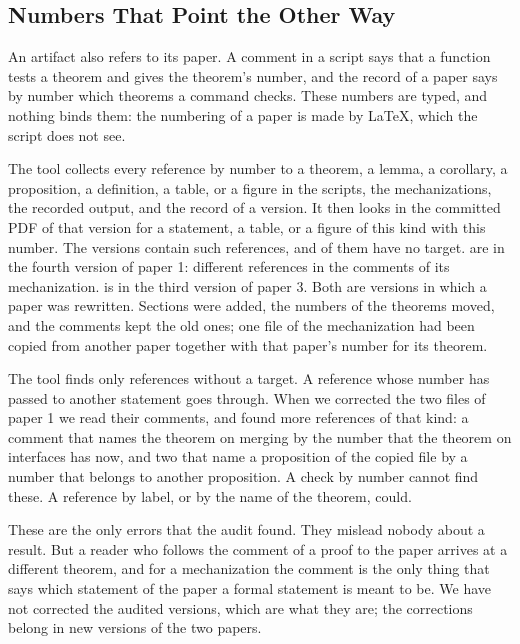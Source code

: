 \documentclass[acmsmall,nonacm,screen]{acmart}
\newcommand{\claim}[2]{#2}
\begin{document}
\subsection{Numbers That Point the Other Way}
\label{sec:refs}

An artifact also refers to its paper. A comment in a script says that a function tests a
theorem and gives the theorem's number, and the record of a paper says by number which
theorems a command checks. These numbers are typed, and nothing binds them: the numbering of
a paper is made by LaTeX, which the script does not see.

The tool collects every reference by number to a theorem, a lemma, a corollary, a
proposition, a definition, a table, or a figure in the scripts, the mechanizations, the
recorded output, and the record of a version. It then looks in the committed PDF of that
version for a statement, a table, or a figure of this kind with this number. The
\exVersions{} versions contain \exRefAll{} such references, and \exRefStale{} of them have
no target. \exRefStaleOne{} are in the fourth version of paper 1: \exRefStaleOneKinds{}
different references in the comments of its mechanization. \exRefStaleThree{} is in the
third version of paper 3. \claim{stale-rewritten}{Both are versions in which a paper was
rewritten.} Sections were added, the numbers of the theorems moved, and the comments kept the
old ones; one file of the mechanization had been copied from another paper together with
that paper's number for its theorem.

The tool finds only references without a target. A reference whose number has passed to
another statement goes through. When we corrected the two files of paper 1 we read their
comments, and found \exRefWrong{} more references of that kind: a comment that names the
theorem on merging by the number that the theorem on interfaces has now, and two that name a
proposition of the copied file by a number that belongs to another proposition. A check by
number cannot find these. A reference by label, or by the name of the theorem, could.

These are the only errors that the audit found. They mislead nobody about a result. But a
reader who follows the comment of a proof to the paper arrives at a different theorem, and
for a mechanization the comment is the only thing that says which statement of the paper a
formal statement is meant to be. We have not corrected the audited versions, which are what
they are; the corrections belong in new versions of the two papers.
\end{document}
